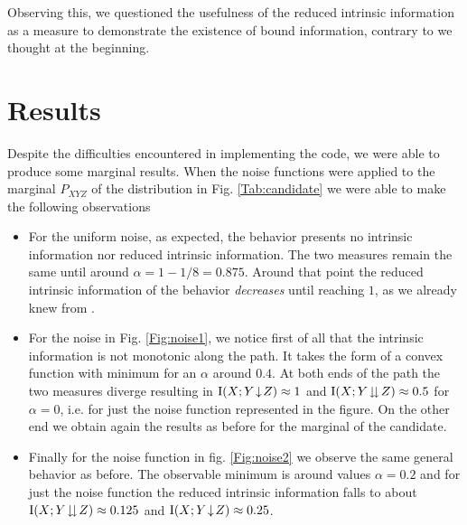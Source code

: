     Observing this, we questioned the usefulness of the reduced intrinsic information as a measure to demonstrate the existence of bound information, contrary to we thought at the beginning.
    
\section{Results}
Despite the difficulties encountered in implementing the code, we were able to produce some marginal results.
When the noise functions were applied to the marginal $P_{XYZ}$ of the distribution in Fig. \ref{Tab:candidate} we were able to make the following observations
\begin{itemize}
\item For the uniform noise, as expected, the behavior presents no intrinsic information nor reduced intrinsic information. The two measures remain the same until around $\alpha = 1- 1/8 = 0.875$. Around that point the reduced intrinsic information of the behavior \textit{decreases} until reaching $1$, as we already knew from \cite{RW03}.

\item For the noise in Fig. \ref{Fig:noise1}, we notice first of all that the intrinsic information is not monotonic along the path. It takes the form of a convex function with minimum for an $\alpha$ around $0.4$. At both ends of the path the two measures diverge resulting in $\operatorname{I}(X;Y\!\downarrow\!Z) \approx 1$ and $\operatorname{I}(X;Y\!\downdownarrows\!Z) \approx 0.5$ for $\alpha = 0$, i.e. for just the noise function represented in the figure. On the other end we obtain again the results as before for the marginal of the candidate.

\item Finally for the noise function in fig. \ref{Fig:noise2} we observe the same general behavior as before. 
The observable minimum is around values $\alpha = 0.2$ and for just the noise function the reduced intrinsic information falls to about $\operatorname{I}(X;Y\!\downdownarrows\!Z) \approx 0.125$ and $\operatorname{I}(X;Y\!\downarrow\!Z) \approx 0.25$.
\end{itemize}

